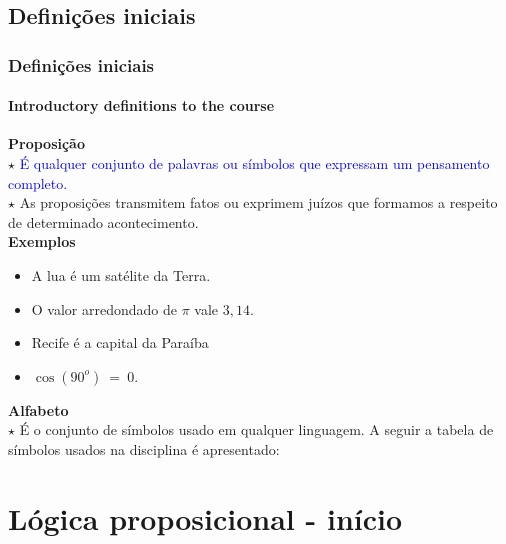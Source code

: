 \documentclass[10pt, headsepline, captions=tableabove, xcolor=table]{beamer}
\begin{document}
\subsection{Definições iniciais}
%
\begin{frame}[t]
    \frametitle{Definições iniciais}
    \framesubtitle{Introductory definitions to the course}
    \textbf{Proposição}\\
    \quad $\star$ \textcolor{blue}{É qualquer conjunto de palavras ou símbolos que expressam um pensamento completo.}\\
    \quad $\star$ As proposições transmitem fatos ou exprimem juízos que formamos a respeito de determinado acontecimento.\\ \pause
    \textbf{Exemplos}
    \begin{itemize}
        \item A lua é um satélite da Terra.\pause
        \item O valor arredondado de $\pi$ vale $3,14$.\pause
        \item Recife é a capital da Paraíba\pause
        \item $\cos(90^o)~=~0$.\pause
    \end{itemize}
    \textbf{Alfabeto}\\
    \quad $\star$ É o conjunto de símbolos usado em qualquer linguagem. A seguir a tabela de símbolos usados na disciplina é apresentado:
\end{frame}
%
\section{Lógica proposicional - início}
%
\end{document}
